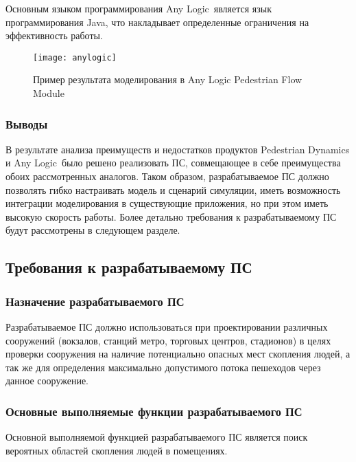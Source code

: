 Основным языком программирования Any Logic\textregistered\ является язык программирования Java, что накладывает определенные ограничения на эффективность работы.

\begin{figure}[ht!]
  \texttt{[image: anylogic]}
  \caption{Пример результата моделирования в Any Logic Pedestrian Flow Module}
  \label{sub:domain:analogs:anylogic:image_example}
\end{figure}

\subsubsection{Выводы}
\label{sub:domain:analogs:results}

В результате анализа преимуществ и недостатков продуктов Pedestrian Dynamics и Any Logic\textregistered\ было решено реализовать ПС, совмещающее в себе преимущества обоих рассмотренных аналогов.
Таком образом, разрабатываемое ПС должно позволять гибко настраивать модель и сценарий симуляции, иметь возможность интеграции моделирования в существующие приложения, но при этом иметь высокую скорость работы.
Более детально требования к разрабатываемому ПС будут рассмотрены в следующем разделе.

\subsection{Требования к разрабатываемому ПС}
\label{sub:domain:requirements}

\subsubsection{Назначение разрабатываемого ПС}
\label{sub:domain:requirements:purpose}

Разрабатываемое ПС должно использоваться при проектировании различных сооружений (вокзалов, станций метро, торговых центров, стадионов) в целях проверки сооружения на наличие потенциально опасных мест скопления людей, а так же для определения максимально допустимого потока пешеходов через данное сооружение.

\subsubsection{Основные выполняемые функции разрабатываемого ПС}
\label{sub:domain:requirements:functions}

Основной выполняемой функцией разрабатываемого ПС является поиск вероятных областей скопления людей в помещениях.

